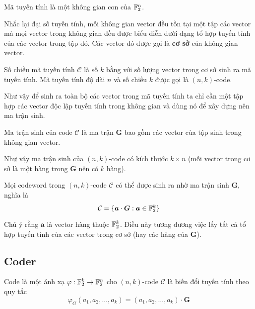 \begin{remark}
    Mã tuyến tính là một không gian con của $\mathbb{F}_2^n$.
\end{remark}

Nhắc lại đại số tuyến tính, mỗi không gian vector đều tồn tại một tập các vector mà mọi vector trong không gian đều được biểu diễn dưới dạng tổ hợp tuyến tính của các vector trong tập đó. Các vector đó được gọi là \textbf{cơ sở} của không gian vector.

\begin{definition}
    Số chiều mã tuyến tính $\mathcal{C}$ là số $k$ bằng với số lượng vector trong cơ sở sinh ra mã tuyến tính. Mã tuyến tính độ dài $n$ và số chiều $k$ được gọi là $(n, k)$-code.
\end{definition}

Như vậy để sinh ra toàn bộ các vector trong mã tuyến tính ta chỉ cần một tập hợp các vector độc lập tuyến tính trong không gian và dùng nó để xây dựng nên ma trận sinh.

\begin{definition}
    Ma trận sinh của code $\mathcal{C}$ là ma trận $\bm{G}$ bao gồm các vector của tập sinh trong không gian vector.

    Như vậy ma trận sinh của $(n, k)$-code có kích thước $k \times n$ (mỗi vector trong cơ sở là một hàng trong $\bm{G}$ nên có $k$ hàng).
\end{definition}

\begin{remark}
    Mọi codeword trong $(n, k)$-code $\mathcal{C}$ có thể được sinh ra nhờ ma trận sinh $\bm{G}$, nghĩa là
    \begin{equation*}
        \mathcal{C} = \{ \bm{a} \cdot \bm{G} : \bm{a} \in \mathbb{F}_2^k \}
    \end{equation*}
\end{remark}

Chú ý rằng $\bm{a}$ là vector hàng thuộc $\mathbb{F}_2^k$. Điều này tương đương việc lấy tất cả tổ hợp tuyến tính của các vector trong cơ sở (hay các hàng của $\bm{G}$).

\subsection*{Coder}

\begin{definition}[Coder]
    Code là một ánh xạ $\varphi: \mathbb{F}_2^k \to \mathbb{F}_2^n$ cho $(n, k)$-code $\mathcal{C}$ là biến đổi tuyến tính theo quy tắc
    \begin{equation*}
        \varphi_G(a_1, a_2, \ldots, a_k) = (a_1, a_2, \ldots, a_k) \cdot \bm{G}
    \end{equation*}
\end{definition}

